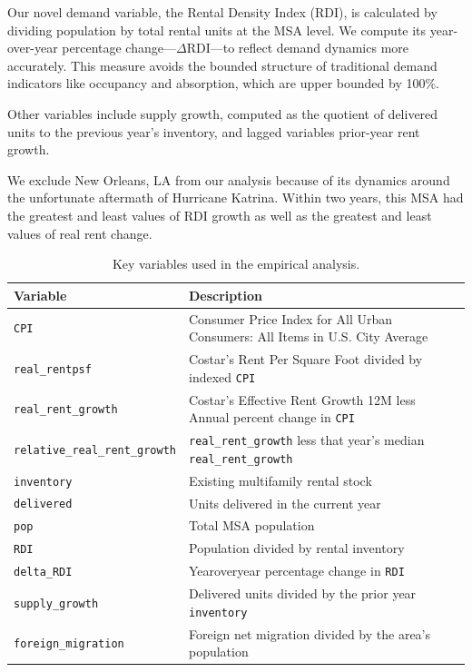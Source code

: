 \documentclass[APA,Times1COL]{WileyNJDv5} %
\begin{document}
Our novel demand variable, the Rental Density Index (RDI), is calculated by dividing population by total rental units at the MSA level. We compute its year-over-year percentage change---\(\Delta\text{RDI}\)---to reflect demand dynamics more accurately. This measure avoids the bounded structure of traditional demand indicators like occupancy and absorption, which are upper bounded by 100\%.

Other variables include supply growth, computed as the quotient of delivered units to the previous year's inventory, and lagged variables prior-year rent growth. 

We exclude New Orleans, LA from our analysis because of its dynamics around the unfortunate aftermath of Hurricane Katrina. Within two years, this MSA had the greatest and least values of RDI growth as well as the greatest and least values of real rent change. 

\begin{table}[hbt]%
\centering
\caption{Key variables used in the empirical analysis.\label{tab:variables}}%
\begin{tabular*}{\textwidth}{@{\extracolsep\fill}ll@{\extracolsep\fill}}%
\toprule
\textbf{Variable} & \textbf{Description} \\
\midrule
\texttt{CPI}					& Consumer Price Index for All Urban Consumers: All Items in U.S. City Average \\
\texttt{real\_rentpsf}               & Costar's Rent Per Square Foot divided by indexed \texttt{CPI}\\
\texttt{real\_rent\_growth}          & Costar's Effective Rent Growth 12M less Annual percent change in \texttt{CPI} \\
\texttt{relative\_real\_rent\_growth}          & \texttt{real\_rent\_growth} less that year's median \texttt{real\_rent\_growth}\\
\texttt{inventory}             & Existing multifamily rental stock \\
\texttt{delivered}             & Units delivered in the current year \\
\texttt{pop}                   & Total MSA population  \\
\texttt{RDI}			       & Population divided by rental inventory \\
\texttt{delta\_RDI}	           & Yearoveryear percentage change in \texttt{RDI} \\
\texttt{supply\_growth}        & Delivered units divided by the prior year \texttt{inventory} \\
\texttt{foreign\_migration}     & Foreign net migration divided by the area's population \\
\bottomrule
\end{tabular*}
\end{table}
\end{document}
